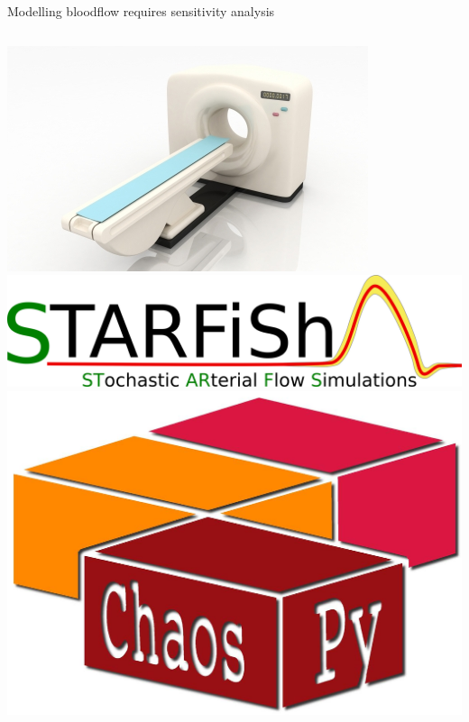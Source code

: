 \documentclass{beamer}
\begin{document}

\begin{frame}{Modelling bloodflow requires sensitivity analysis}{}
    \begin{columns}
        \includegraphics[width=\textwidth]{ntnu/ID-10015904.jpg}
        \includegraphics[width=\textwidth]{ntnu/STARFiSh-Logo_small_transparent.png}
        \includegraphics[width=\textwidth]{chaospy_logo.jpg}

\end{columns}
\end{frame}
\end{document}
